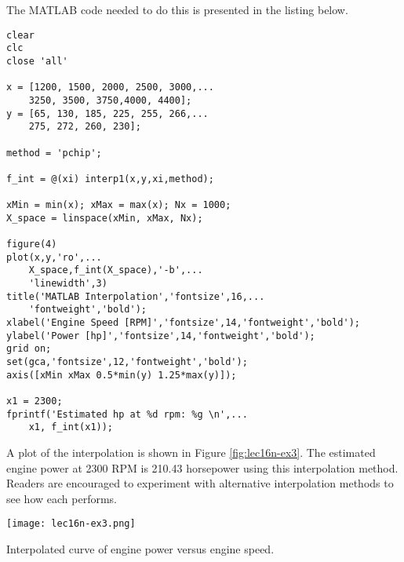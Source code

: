 The MATLAB code needed to do this is presented in the listing below.

\begin{lstlisting}[style=myMatlab,name=ex3]
clear
clc
close 'all'

x = [1200, 1500, 2000, 2500, 3000,...
    3250, 3500, 3750,4000, 4400];
y = [65, 130, 185, 225, 255, 266,...
    275, 272, 260, 230];

method = 'pchip';

f_int = @(xi) interp1(x,y,xi,method);

xMin = min(x); xMax = max(x); Nx = 1000;
X_space = linspace(xMin, xMax, Nx);

figure(4)
plot(x,y,'ro',...
    X_space,f_int(X_space),'-b',...
    'linewidth',3)
title('MATLAB Interpolation','fontsize',16,...
    'fontweight','bold');
xlabel('Engine Speed [RPM]','fontsize',14,'fontweight','bold');
ylabel('Power [hp]','fontsize',14,'fontweight','bold');
grid on;
set(gca,'fontsize',12,'fontweight','bold');
axis([xMin xMax 0.5*min(y) 1.25*max(y)]);

x1 = 2300;
fprintf('Estimated hp at %d rpm: %g \n',...
    x1, f_int(x1));
\end{lstlisting}
A plot of the interpolation is shown in Figure \ref{fig:lec16n-ex3}.  The estimated engine power at 2300 RPM is 210.43 horsepower using this interpolation method.  Readers are encouraged to experiment with alternative interpolation methods to see how each performs.
\begin{marginfigure}
\texttt{[image: lec16n-ex3.png]}
\caption{Interpolated curve of engine power versus engine speed.}
\label{fig:lec16n-ex3}
\end{marginfigure}

